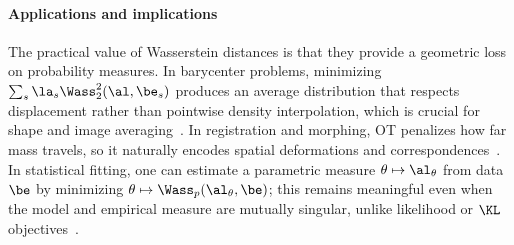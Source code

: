 \paragraph{Applications and implications}

The practical value of Wasserstein distances is that they provide a geometric loss on probability measures. In barycenter problems, minimizing $\sum_s\la_s\Wass_2^2(\al,\be_s)$ produces an average distribution that respects displacement rather than pointwise density interpolation, which is crucial for shape and image averaging~\cite{Carlier_wasserstein_barycenter,CuturiBarycenter,2015-solomon-siggraph}. In registration and morphing, OT penalizes how far mass travels, so it naturally encodes spatial deformations and correspondences~\cite{haker2004optimal,peyre2012wasserstein,GramfortPC15}. In statistical fitting, one can estimate a parametric measure $\theta\mapsto\al_\theta$ from data $\be$ by minimizing $\theta\mapsto\Wass_p(\al_\theta,\be)$; this remains meaningful even when the model and empirical measure are mutually singular, unlike likelihood or $\KL$ objectives~\cite{CanasRosasco,FrognerNIPS}.
